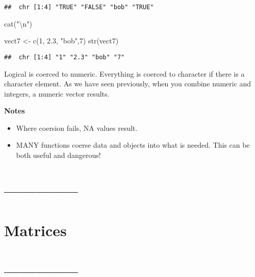 \documentclass[
]{article}
\newenvironment{Shaded}{\begin{snugshade}}{\end{snugshade}}
\newcommand{\DecValTok}[1]{\textcolor[rgb]{0.00,0.00,0.81}{#1}}
\newcommand{\FloatTok}[1]{\textcolor[rgb]{0.00,0.00,0.81}{#1}}
\newcommand{\FunctionTok}[1]{\textcolor[rgb]{0.00,0.00,0.00}{#1}}
\newcommand{\NormalTok}[1]{#1}
\newcommand{\OtherTok}[1]{\textcolor[rgb]{0.56,0.35,0.01}{#1}}
\newcommand{\SpecialCharTok}[1]{\textcolor[rgb]{0.00,0.00,0.00}{#1}}
\newcommand{\StringTok}[1]{\textcolor[rgb]{0.31,0.60,0.02}{#1}}
\providecommand{\tightlist}{%
  \setlength{\itemsep}{0pt}\setlength{\parskip}{0pt}}
\begin{document}
\begin{verbatim}
##  chr [1:4] "TRUE" "FALSE" "bob" "TRUE"
\end{verbatim}

\begin{Shaded}
\begin{Highlighting}[]
\FunctionTok{cat}\NormalTok{(}\StringTok{"}\SpecialCharTok{\textbackslash{}n}\StringTok{"}\NormalTok{)}
\end{Highlighting}
\end{Shaded}

\begin{Shaded}
\begin{Highlighting}[]
\NormalTok{vect7 }\OtherTok{\textless{}{-}} \FunctionTok{c}\NormalTok{(}\DecValTok{1}\NormalTok{, }\FloatTok{2.3}\NormalTok{, }\StringTok{"bob"}\NormalTok{,}\DecValTok{7}\NormalTok{)}
\FunctionTok{str}\NormalTok{(vect7)}
\end{Highlighting}
\end{Shaded}

\begin{verbatim}
##  chr [1:4] "1" "2.3" "bob" "7"
\end{verbatim}

Logical is coerced to numeric. Everything is coerced to character if
there is a character element. As we have seen previously, when you
combine numeric and integers, a numeric vector results.

\textbf{Notes}

\begin{itemize}
\tightlist
\item
  Where coersion fails, NA values result.
\item
  MANY functions coerse data and objects into what is needed. This can
  be both useful and dangerous!
\end{itemize}

\hypertarget{section-26}{%
\section{--------------}\label{section-26}}

\hypertarget{matrices}{%
\section{Matrices}\label{matrices}}

\hypertarget{section-27}{%
\section{--------------}\label{section-27}}
\end{document}
